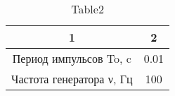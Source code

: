 \begin{table} 
 \caption{Table2}
\begin{tabular}{|*{2}{c|}}
\hline 
1 & 2\\ \hline 
Период импульсов To, c & 0.01 \\ \hline 
 Частота генератора ν, Гц & 100 \\ \hline 
 \end{tabular} 
\end{table} 
